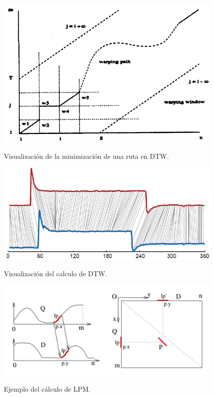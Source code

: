 \begin{figure}[h]
\vspace{0.1in}
\begin{center}
\includegraphics[scale=0.6]{dtw.png}\\
\end{center}
\caption{Visualizaci\'on de la minimizaci\'on de una ruta en DTW.}
\label{arm:fig3}
\end{figure}
\begin{figure}[h]
\vspace{0.1in}
\begin{center}
\includegraphics[scale=0.6]{dtw2.png}\\
\end{center}
\caption{Visualizaci\'on del calculo de DTW.}
\label{arm:fig4}
\end{figure}
\begin{figure}[h]
\vspace{0.1in}
\begin{center}
\includegraphics[scale=0.6]{spade.png}\\
\end{center}
\caption{Ejemplo del c\'alculo de LPM.}
\label{arm:fig5}
\end{figure}
